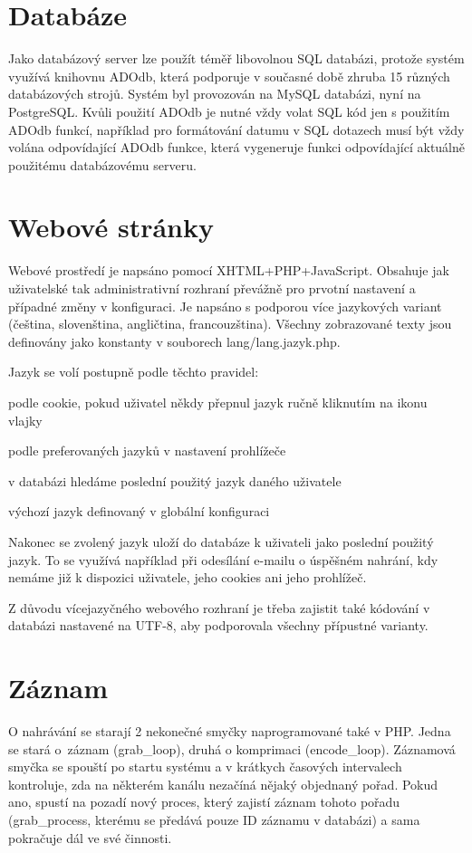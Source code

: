 \section{Databáze}
Jako databázový server lze použít téměř libovolnou SQL databázi, protože systém využívá knihovnu ADOdb, která podporuje v současné době zhruba 15 různých databázových strojů. Systém byl provozován na MySQL databázi, nyní na PostgreSQL. Kvůli použití ADOdb je nutné vždy volat SQL kód jen s použitím ADOdb funkcí, například pro formátování datumu v SQL dotazech musí být vždy volána odpovídající ADOdb funkce, která vygeneruje funkci odpovídající aktuálně použitému databázovému serveru.
\section{Webové stránky}
Webové prostředí je napsáno pomocí XHTML+PHP+JavaScript. Obsahuje jak uživatelské tak administrativní rozhraní převážně pro prvotní nastavení a případné změny v konfiguraci. Je napsáno s podporou více jazykových variant (čeština, slovenština, angličtina, francouzština). Všechny zobrazované texty jsou definovány jako konstanty v souborech lang/lang.jazyk.php.

Jazyk se volí postupně podle těchto pravidel:
\bitem
\item podle cookie, pokud uživatel někdy přepnul jazyk ručně kliknutím na ikonu vlajky
\item podle preferovaných jazyků v nastavení prohlížeče
\item v databázi hledáme poslední použitý jazyk daného uživatele
\item výchozí jazyk definovaný v globální konfiguraci 
\eitem

Nakonec se zvolený jazyk uloží do databáze k uživateli jako poslední použitý jazyk. To se využívá například při odesílání e-mailu o úspěšném nahrání, kdy nemáme již k dispozici uživatele, jeho cookies ani jeho prohlížeč.

Z důvodu vícejazyčného webového rozhraní je třeba zajistit také kódování v databázi nastavené na UTF-8, aby podporovala všechny přípustné varianty.

\section{Záznam}

O nahrávání se starají 2 nekonečné smyčky naprogramované také v PHP. Jedna se stará \linebreak[4]o~záznam (grab\_loop), druhá o komprimaci (encode\_loop). Záznamová smyčka se spouští po startu systému a v krátkych časových intervalech kontroluje, zda na některém kanálu nezačíná nějaký objednaný pořad. 
Pokud ano, spustí na pozadí nový proces, který zajistí záznam tohoto pořadu (grab\_process, kterému se předává pouze ID záznamu v databázi) a sama pokračuje dál ve své činnosti.

